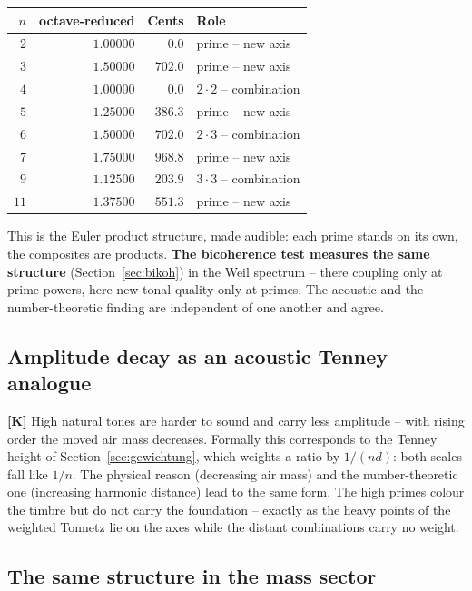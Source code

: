 \begin{center}
\begin{tabular}{rrrl}
\toprule
$n$ & octave-reduced & Cents & Role \\
\midrule
$2$ & $1.00000$ & $0.0$ & prime -- new axis \\
$3$ & $1.50000$ & $702.0$ & prime -- new axis \\
$4$ & $1.00000$ & $0.0$ & $2\cdot2$ -- combination \\
$5$ & $1.25000$ & $386.3$ & prime -- new axis \\
$6$ & $1.50000$ & $702.0$ & $2\cdot3$ -- combination \\
$7$ & $1.75000$ & $968.8$ & prime -- new axis \\
$9$ & $1.12500$ & $203.9$ & $3\cdot3$ -- combination \\
$11$ & $1.37500$ & $551.3$ & prime -- new axis \\
\bottomrule
\end{tabular}
\end{center}

This is the Euler product structure, made audible: each prime stands on
its own, the composites are products. \textbf{The bicoherence test
measures the same structure} (Section~\ref{sec:bikoh}) in the Weil
spectrum -- there coupling only at prime powers, here new tonal quality
only at primes. The acoustic and the number-theoretic finding are
independent of one another and agree.

\subsection{Amplitude decay as an acoustic Tenney analogue}

\textbf{[K]} High natural tones are harder to sound and carry less
amplitude -- with rising order the moved air mass decreases. Formally
this corresponds to the Tenney height of
Section~\ref{sec:gewichtung}, which weights a ratio by $1/(nd)$: both
scales fall like $1/n$. The physical reason (decreasing air mass) and
the number-theoretic one (increasing harmonic distance) lead to the
same form. The high primes colour the timbre but do not carry the
foundation -- exactly as the heavy points of the weighted Tonnetz lie
on the axes while the distant combinations carry no weight.

\subsection{The same structure in the mass sector}
\label{sec:massen}

